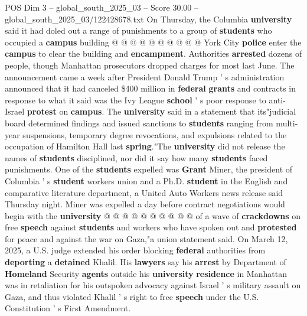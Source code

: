 \begin{textsample}{POS Dim 3 – global\_south\_2025\_03 – Score 30.00 – global\_south\_2025\_03/122428678.txt}
On Thursday, the Columbia \textbf{university} said it had doled out a range of punishments to a group of \textbf{students} who occupied a \textbf{campus} building @ @ @ @ @ @ @ @ @ @ York City \textbf{police} enter the \textbf{campus} to clear the building and \textbf{encampment}.
Authorities \textbf{arrested} dozens of people, though Manhattan prosecutors dropped charges for most last June.
The announcement came a week after President Donald Trump ' s administration announced that it had canceled \$400 million in \textbf{federal} \textbf{grants} and contracts in response to what it said was the Ivy League \textbf{school} ' s poor response to anti-Israel \textbf{protest} on \textbf{campus}.
The \textbf{university} said in a statement that its"judicial board determined findings and issued sanctions to \textbf{students} ranging from multi-year suspensions, temporary degree revocations, and expulsions related to the occupation of Hamilton Hall last \textbf{spring}."The \textbf{university} did not release the names of \textbf{students} disciplined, nor did it say how many \textbf{students} faced punishments.
One of the \textbf{students} expelled was \textbf{Grant} Miner, the president of Columbia ' s \textbf{student} workers union and a Ph.D. \textbf{student} in the English and comparative literature department, a United Auto Workers news release said Thursday night.
Miner was expelled a day before contract negotiations would begin with the \textbf{university} @ @ @ @ @ @ @ @ @ @ of a wave of \textbf{crackdowns} on free \textbf{speech} against \textbf{students} and workers who have spoken out and \textbf{protested} for peace and against the war on Gaza,"a union statement said.
On March 12, 2025, a U.S. judge extended his order blocking \textbf{federal} authorities from \textbf{deporting} a \textbf{detained} Khalil.
His \textbf{lawyers} say his \textbf{arrest} by Department of \textbf{Homeland} Security \textbf{agents} outside his \textbf{university} \textbf{residence} in Manhattan was in retaliation for his outspoken advocacy against Israel ' s military assault on Gaza, and thus violated Khalil ' s right to free \textbf{speech} under the U.S.
Constitution ' s First Amendment.

\end{textsample}
